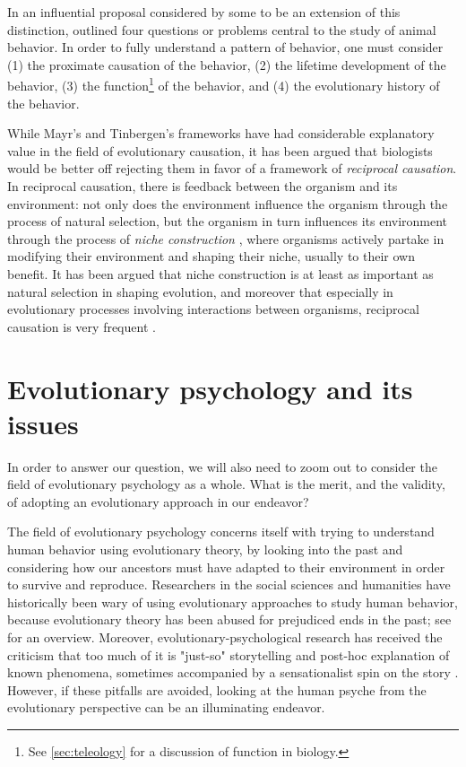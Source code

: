 In an influential proposal considered by some to be an extension of this distinction, \citet{Tinbergen63} outlined four questions or problems central to the study of animal behavior. In order to fully understand a pattern of behavior, one must consider (1) the proximate causation of the behavior, (2) the lifetime development of the behavior, (3) the function\footnote{See \cref{sec:teleology} for a discussion of function in biology.} of the behavior, and (4) the evolutionary history of the behavior.

While Mayr's and Tinbergen's frameworks have had considerable explanatory value in the field of evolutionary causation, it has been argued \citep{Laland13} that biologists would be better off rejecting them in favor of a framework of \emph{reciprocal causation}.
In reciprocal causation, there is feedback between the organism and its environment: not only does the environment influence the organism through the process of natural selection, but the organism in turn influences its environment through the process of \emph{niche construction} \citep{Svensson18}, where organisms actively partake in modifying their environment and shaping their niche, usually to their own benefit. It has been argued that niche construction is at least as important as natural selection in shaping evolution, and moreover that especially in evolutionary processes involving interactions between organisms, reciprocal causation is very frequent \citep{Svensson18}.

\section{Evolutionary psychology and its issues}
\label{sec:evol-psych}
In order to answer our question, we will also need to zoom out to consider the field of evolutionary psychology as a whole. What is the merit, and the validity, of adopting an evolutionary approach in our endeavor?

The field of evolutionary psychology concerns itself with trying to understand human behavior using evolutionary theory, by looking into the past and considering how our ancestors must have adapted to their environment in order to survive and reproduce.
Researchers in the social sciences and humanities have historically been wary of using evolutionary approaches to study human behavior, because evolutionary theory has been abused for prejudiced ends in the past; see \citet[pp.~19--20]{LB02} for an overview. Moreover, evolutionary-psychological research has received the criticism that too much of it is "just-so" storytelling and post-hoc explanation of known phenomena, sometimes accompanied by a sensationalist spin on the story \citep{LB02}.
However, if these pitfalls are avoided, looking at the human psyche from the evolutionary perspective can be an illuminating endeavor.

